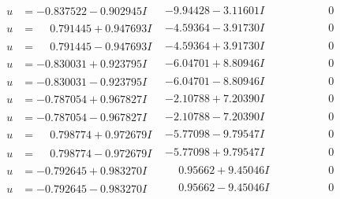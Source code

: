 \documentclass[1p]{elsarticle_modified}
\theoremstyle{definition}
\begin{document}
$$\begin{array}{c|c|c}
\begin{aligned}
u &= -0.837522 - 0.902945 I\end{aligned}
 & -9.94428 - 3.11601 I & \phantom{-0.000000 } 0 \\ \hline\begin{aligned}
u &= \phantom{-}0.791445 + 0.947693 I\end{aligned}
 & -4.59364 - 3.91730 I & \phantom{-0.000000 } 0 \\ \hline\begin{aligned}
u &= \phantom{-}0.791445 - 0.947693 I\end{aligned}
 & -4.59364 + 3.91730 I & \phantom{-0.000000 } 0 \\ \hline\begin{aligned}
u &= -0.830031 + 0.923795 I\end{aligned}
 & -6.04701 + 8.80946 I & \phantom{-0.000000 } 0 \\ \hline\begin{aligned}
u &= -0.830031 - 0.923795 I\end{aligned}
 & -6.04701 - 8.80946 I & \phantom{-0.000000 } 0 \\ \hline\begin{aligned}
u &= -0.787054 + 0.967827 I\end{aligned}
 & -2.10788 + 7.20390 I & \phantom{-0.000000 } 0 \\ \hline\begin{aligned}
u &= -0.787054 - 0.967827 I\end{aligned}
 & -2.10788 - 7.20390 I & \phantom{-0.000000 } 0 \\ \hline\begin{aligned}
u &= \phantom{-}0.798774 + 0.972679 I\end{aligned}
 & -5.77098 - 9.79547 I & \phantom{-0.000000 } 0 \\ \hline\begin{aligned}
u &= \phantom{-}0.798774 - 0.972679 I\end{aligned}
 & -5.77098 + 9.79547 I & \phantom{-0.000000 } 0 \\ \hline\begin{aligned}
u &= -0.792645 + 0.983270 I\end{aligned}
 & \phantom{-}0.95662 + 9.45046 I & \phantom{-0.000000 } 0 \\ \hline\begin{aligned}
u &= -0.792645 - 0.983270 I\end{aligned}
 & \phantom{-}0.95662 - 9.45046 I & \phantom{-0.000000 } 0 \\ \hline\begin{aligned}

\end{aligned}
\end{array}$$
\end{document}
